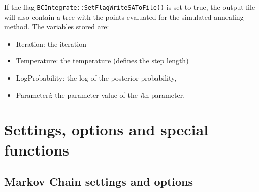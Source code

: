 \documentclass[11pt, a4paper]{article}
\begin{document}
If the flag \verb|BCIntegrate::SetFlagWriteSAToFile()| is set to true,
the output file will also contain a tree with the points evaluated for
the simulated annealing method. The variables stored are:
%
\begin{itemize}
\item Iteration: the iteration
\item Temperature: the temperature (defines the step length)
\item LogProbability:  the log of the posterior probability,
\item Parameter{\it i}: the parameter value of the \textit{i}th parameter.
\end{itemize}


\section{Settings, options and special functions}
\label{section:settings}


\subsection{Markov Chain settings and options}
\label{section:settings:MCMC}
\end{document}
